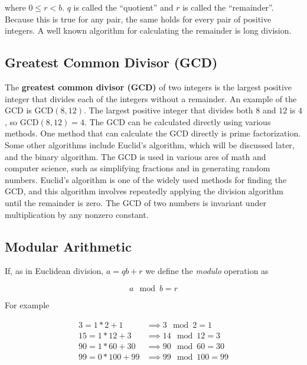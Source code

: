 \documentclass{article}
\renewcommand{\_}{\ifincsname_\else\legacyunderscore\fi}
\begin{document}
        where $0 \leq r < b$.  $q$ is called the ``quotient'' and $r$ is called the ``remainder''.  Because this is true for any pair, the same holds for every pair of positive integers.  A well known algorithm for calculating the remainder is long division.

    \subsection*{Greatest Common Divisor (GCD)}
    The \textbf{greatest common divisor (GCD)} of two integers is the largest positive integer that divides each of the integers without a remainder. An example of the GCD is GCD$(8, 12)$. The largest positive integer that divides both $8$ and $12$ is $4$, so GCD$(8, 12)=4$. The GCD can be calculated directly using various methods. One method that can calculate the GCD directly is prime factorization. Some other algorithms include Euclid's algorithm, which will be discussed later, and the binary algorithm. The GCD is used in various ares of math and computer science, such as simplifying fractions and in generating random numbers. Euclid's algorithm is one of the widely used methods for finding the GCD, and this algorithm involves repeatedly applying the division algorithm until the remainder is zero. The GCD of two numbers is invariant under multiplication by any nonzero constant.  
    
    

    \subsection*{Modular Arithmetic}

        If, as in Euclidean division, $a = q b + r$ we define the \emph{modulo} operation as

        \begin{equation}
            a \mod b = r
        \end{equation}

        For example

        \begin{align}
            \label{eq:isEven1}      3  = 1 * 2   + 1  &\implies 3  \mod 2   = 1 \\
            \label{eq:clock1}       15 = 1 * 12  + 3  &\implies 14 \mod 12  = 3 \\
            \label{eq:minutes1}     90 = 1 * 60  + 30 &\implies 90 \mod 60  = 30 \\
            \label{eq:zeroQutient1} 99 = 0 * 100 + 99 &\implies 99 \mod 100 = 99
        \end{align}
\end{document}
